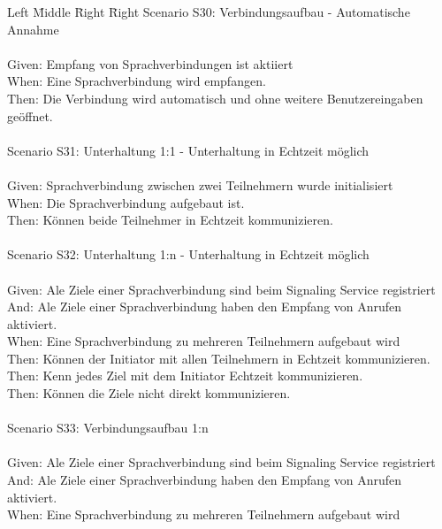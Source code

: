 \begin{tabbing}
    Left \= Middle \= Right \= Right \kill
    Scenario S30: \> \> \> Verbindungsaufbau - Automatische Annahme \\ \\
    Given:  \> \> \> Empfang von Sprachverbindungen ist aktiiert\\
    When:   \> \> \> Eine Sprachverbindung wird empfangen.\\
    Then:   \> \> \> Die Verbindung wird automatisch und ohne weitere Benutzereingaben geöffnet. \\
    \\
    Scenario S31: \> \> \> Unterhaltung 1:1 - Unterhaltung in Echtzeit möglich \\ \\
    Given:  \> \> \> Sprachverbindung zwischen zwei Teilnehmern wurde initialisiert\\
    When:   \> \> \> Die Sprachverbindung aufgebaut ist. \\
    Then:   \> \> \> Können beide Teilnehmer in Echtzeit kommunizieren.\\
    \\
    Scenario S32: \> \> \> Unterhaltung 1:n - Unterhaltung in Echtzeit möglich \\ \\
    Given:  \> \> \> Ale Ziele einer Sprachverbindung sind beim Signaling Service registriert\\
    And:  \> \> \> Ale Ziele einer Sprachverbindung haben den Empfang von Anrufen aktiviert.\\
    When:   \> \> \> Eine Sprachverbindung zu mehreren Teilnehmern aufgebaut wird\\
    Then:   \> \> \> Können der Initiator mit allen Teilnehmern in Echtzeit kommunizieren.\\
    Then:   \> \> \> Kenn jedes Ziel mit dem Initiator Echtzeit kommunizieren.\\
    Then:   \> \> \> Können die Ziele nicht direkt kommunizieren.\\
    \\
    Scenario S33: \> \> \> Verbindungsaufbau 1:n  \\ \\
    Given:  \> \> \> Ale Ziele einer Sprachverbindung sind beim Signaling Service registriert\\
    And:  \> \> \> Ale Ziele einer Sprachverbindung haben den Empfang von Anrufen aktiviert.\\
    When:   \> \> \> Eine Sprachverbindung zu mehreren Teilnehmern aufgebaut wird\\

\end{tabbing}
